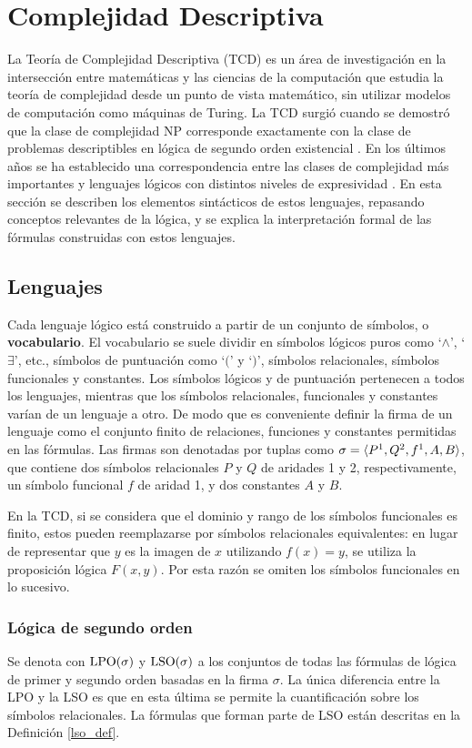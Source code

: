 \section{Complejidad Descriptiva}
La Teoría de Complejidad Descriptiva (TCD) es un área de investigación en la
intersección entre matemáticas y las ciencias de la computación 
que estudia la teoría de complejidad desde un punto de vista matemático, 
sin utilizar modelos de computación como máquinas de Turing. La TCD surgió
cuando se demostró que la clase de complejidad NP corresponde
exactamente con la clase de problemas descriptibles en lógica de segundo orden
existencial \cite{fagin:spectra}. En los últimos años se ha establecido una
correspondencia entre las clases de complejidad más importantes y lenguajes
lógicos con distintos niveles de expresividad \cite{immerman:book}. En esta
sección se describen los elementos sintácticos de estos lenguajes, repasando
conceptos relevantes de la lógica, y se explica la interpretación formal de
las fórmulas construidas con estos lenguajes.

\subsection{Lenguajes}
Cada lenguaje lógico está construido a partir de un conjunto de símbolos, o
\textbf{vocabulario}.
El vocabulario se suele dividir en símbolos lógicos puros como `$\land$',
`$\exists$', etc., símbolos de puntuación como `$($' y `$)$', símbolos
relacionales, símbolos funcionales y constantes. Los símbolos lógicos y de
puntuación pertenecen a todos los lenguajes, mientras que los símbolos
relacionales, funcionales y constantes varían de un lenguaje a otro. De modo
que es conveniente definir la firma de un lenguaje como el conjunto finito de
relaciones, funciones y constantes permitidas en las fórmulas. Las firmas son
denotadas por tuplas como $\sigma=\langle P^1,Q^2,f^1,A,B \rangle$, que contiene dos
símbolos relacionales $P$ y $Q$ de aridades 1 y 2, respectivamente, un símbolo
funcional $f$ de aridad 1, y dos constantes $A$ y $B$.

En la TCD, si se considera que el dominio y rango de los símbolos funcionales
es finito, estos pueden reemplazarse por símbolos relacionales
equivalentes: en lugar de representar que $y$ es la imagen de $x$ utilizando
$f(x) = y$, se utiliza la proposición lógica $F(x, y)$.
Por esta razón se omiten los símbolos funcionales en lo sucesivo.

\subsubsection{Lógica de segundo orden}
Se denota con $\text{LPO}(\sigma)$ y $\text{LSO}(\sigma)$ a los conjuntos de todas las
fórmulas de lógica de primer y segundo orden basadas en la firma $\sigma$.
La única diferencia entre la LPO y la LSO es que en esta última se permite la
cuantificación sobre los símbolos relacionales. La fórmulas que forman parte
de LSO están descritas en la Definición \ref{lso_def}.

